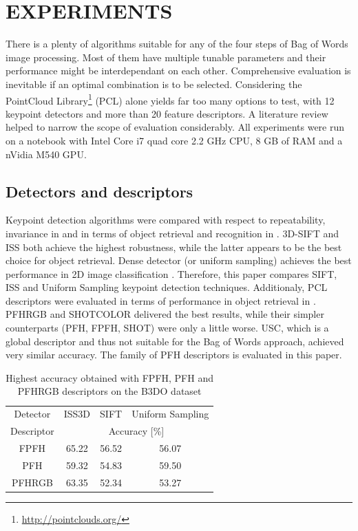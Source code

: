 \documentclass[11pt,twoside]{article}
\begin{document}
\section{ EXPERIMENTS }
  There is a plenty of algorithms suitable for any of the four steps of Bag of Words image processing. Most of them have multiple tunable parameters and their performance might be interdependant on each other. Comprehensive evaluation is inevitable if an optimal combination is to be selected. Considering the PointCloud Library\footnote{\url{http://pointclouds.org/}} (PCL) alone yields far too many options to test, with 12 keypoint detectors and more than 20 feature descriptors. A literature review helped to narrow the scope of evaluation considerably. All experiments were run on a notebook with Intel Core i7 quad core 2.2 GHz CPU, 8 GB of RAM and a nVidia M540 GPU. 

  \subsection{Detectors and descriptors}
    Keypoint detection algorithms were compared with respect to repeatability, invariance in \cite{pcl_keypoint_comparision} and in terms of object retrieval and recognition in \cite{3d_keypoint_eval}. 3D-SIFT and ISS both achieve the highest robustness, while the latter appears to be the best choice for object retrieval. Dense detector (or uniform sampling) achieves the best performance in 2D image classification \cite{tsai2012bag}. Therefore, this paper compares SIFT, ISS and Uniform Sampling keypoint detection techniques. Additionaly, PCL descriptors were evaluated in terms of performance in object retrieval in \cite{pcl_features}. PFHRGB and SHOTCOLOR delivered the best results, while their simpler counterparts (PFH, FPFH, SHOT) were only a little worse. USC, which is a global descriptor and thus not suitable for the Bag of Words approach, achieved very similar accuracy. The family of PFH descriptors is evaluated in this paper.
    
    \begin{table}[!hbtp]
    \centering
      \caption{Highest accuracy obtained with FPFH, PFH and PFHRGB descriptors on the B3DO dataset}
      \label{tab:desc_b3do}
     \begin{tabular}{*4c}
     \toprule
       Detector & ISS3D & SIFT & Uniform Sampling  \\ 
       Descriptor & \multicolumn{3}{c}{Accuracy {[\%]}} \\
     \midrule
       FPFH & 65.22 &  56.52 & 56.07  \\ 
       PFH & 59.32 &  54.83 & 59.50 \\
       PFHRGB & 63.35 & 52.34 & 53.27 \\
       
   \bottomrule
    \end{tabular}
    \end{table}
\end{document}
